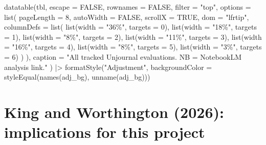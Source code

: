 \documentclass[
  11pt,
  letterpaper,
]{article}
\newenvironment{Shaded}{\begin{snugshade}}{\end{snugshade}}
\newcommand{\AttributeTok}[1]{\textcolor[rgb]{0.40,0.45,0.13}{#1}}
\newcommand{\ConstantTok}[1]{\textcolor[rgb]{0.56,0.35,0.01}{#1}}
\newcommand{\DecValTok}[1]{\textcolor[rgb]{0.68,0.00,0.00}{#1}}
\newcommand{\FunctionTok}[1]{\textcolor[rgb]{0.28,0.35,0.67}{#1}}
\newcommand{\NormalTok}[1]{\textcolor[rgb]{0.00,0.23,0.31}{#1}}
\newcommand{\SpecialCharTok}[1]{\textcolor[rgb]{0.37,0.37,0.37}{#1}}
\newcommand{\StringTok}[1]{\textcolor[rgb]{0.13,0.47,0.30}{#1}}
\begin{document}
\begin{tcolorbox}
\begin{table}[H]
\begin{Shaded}
\begin{Highlighting}[]
\FunctionTok{datatable}\NormalTok{(tbl, }\AttributeTok{escape =} \ConstantTok{FALSE}\NormalTok{, }\AttributeTok{rownames =} \ConstantTok{FALSE}\NormalTok{, }\AttributeTok{filter =} \StringTok{"top"}\NormalTok{,}
  \AttributeTok{options =} \FunctionTok{list}\NormalTok{(}
    \AttributeTok{pageLength =} \DecValTok{8}\NormalTok{, }\AttributeTok{autoWidth =} \ConstantTok{FALSE}\NormalTok{, }\AttributeTok{scrollX =} \ConstantTok{TRUE}\NormalTok{, }\AttributeTok{dom =} \StringTok{"lfrtip"}\NormalTok{,}
    \AttributeTok{columnDefs =} \FunctionTok{list}\NormalTok{(}
      \FunctionTok{list}\NormalTok{(}\AttributeTok{width =} \StringTok{"36\%"}\NormalTok{, }\AttributeTok{targets =} \DecValTok{0}\NormalTok{),}
      \FunctionTok{list}\NormalTok{(}\AttributeTok{width =} \StringTok{"18\%"}\NormalTok{, }\AttributeTok{targets =} \DecValTok{1}\NormalTok{),}
      \FunctionTok{list}\NormalTok{(}\AttributeTok{width =} \StringTok{"8\%"}\NormalTok{,  }\AttributeTok{targets =} \DecValTok{2}\NormalTok{),}
      \FunctionTok{list}\NormalTok{(}\AttributeTok{width =} \StringTok{"11\%"}\NormalTok{, }\AttributeTok{targets =} \DecValTok{3}\NormalTok{),}
      \FunctionTok{list}\NormalTok{(}\AttributeTok{width =} \StringTok{"16\%"}\NormalTok{, }\AttributeTok{targets =} \DecValTok{4}\NormalTok{),}
      \FunctionTok{list}\NormalTok{(}\AttributeTok{width =} \StringTok{"8\%"}\NormalTok{,  }\AttributeTok{targets =} \DecValTok{5}\NormalTok{),}
      \FunctionTok{list}\NormalTok{(}\AttributeTok{width =} \StringTok{"3\%"}\NormalTok{,  }\AttributeTok{targets =} \DecValTok{6}\NormalTok{)}
\NormalTok{    )}
\NormalTok{  ),}
  \AttributeTok{caption =} \StringTok{"All tracked Unjournal evaluations. NB = NotebookLM analysis link."}
\NormalTok{) }\SpecialCharTok{|\textgreater{}}
  \FunctionTok{formatStyle}\NormalTok{(}\StringTok{"Adjustment"}\NormalTok{,}
    \AttributeTok{backgroundColor =} \FunctionTok{styleEqual}\NormalTok{(}\FunctionTok{names}\NormalTok{(adj\_bg), }\FunctionTok{unname}\NormalTok{(adj\_bg)))}
\end{Highlighting}
\end{Shaded}

\end{table}%

\end{tcolorbox}

\section{King and Worthington (2026): implications for this
project}\label{sec-peerless-context}
\end{document}
